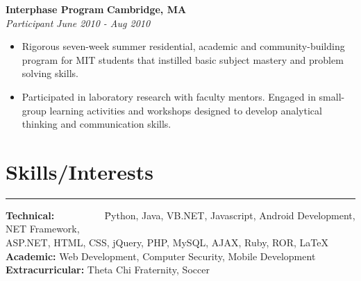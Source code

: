 \documentclass{res}
\begin{document}
\begin{resume}
 {\bf Interphase Program} \hfill {\bf Cambridge, MA} \\
{\textit {Participant}} \hfill {\textit {June 2010 - Aug 2010 }}
 \begin{itemize} 
\renewcommand{\labelitemi}{\ding{117}}
\itemsep -2pt  %
 \item	Rigorous seven-week summer residential, academic and community-building program for MIT students that instilled basic subject mastery and problem solving skills.
 \item Participated in laboratory research with faculty mentors. Engaged in small-group learning activities and workshops designed to develop analytical thinking and communication skills.
 \end{itemize}

\section{{\large Skills/Interests}}

\vspace{-10pt}

\noindent\rule{\resumewidth}{0.4pt}   %

\vspace{-10pt}

\begin{tabbing}

 {\bf Technical: } ~~~~~~~~~ \= Python, Java, VB.NET, Javascript, Android Development, NET Framework, \\
\> ASP.NET, HTML, CSS, jQuery, PHP, MySQL, AJAX, Ruby, ROR, \LaTeX \\
{\bf Academic: } \>  Web Development, Computer Security, Mobile Development \\
{\bf Extracurricular: } \> Theta Chi Fraternity, Soccer \\
\end{tabbing}

\end{resume} 
\end{document}
